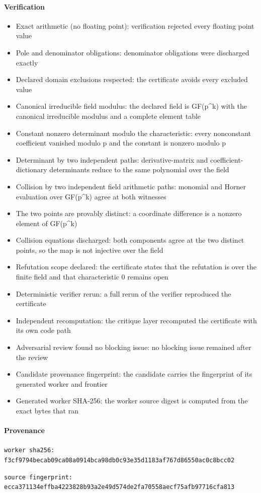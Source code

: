\documentclass{article}
\begin{document}
\paragraph{Verification}
\begin{itemize}
  \item \checkmark Exact arithmetic (no floating point): verification rejected every floating point value
  \item \checkmark Pole and denominator obligations: denominator obligations were discharged exactly
  \item \checkmark Declared domain exclusions respected: the certificate avoids every excluded value
  \item \checkmark Canonical irreducible field modulus: the declared field is GF(p\textasciicircum{}k) with the canonical irreducible modulus and a complete element table
  \item \checkmark Constant nonzero determinant modulo the characteristic: every nonconstant coefficient vanished modulo p and the constant is nonzero modulo p
  \item \checkmark Determinant by two independent paths: derivative-matrix and coefficient-dictionary determinants reduce to the same polynomial over the field
  \item \checkmark Collision by two independent field arithmetic paths: monomial and Horner evaluation over GF(p\textasciicircum{}k) agree at both witnesses
  \item \checkmark The two points are provably distinct: a coordinate difference is a nonzero element of GF(p\textasciicircum{}k)
  \item \checkmark Collision equations discharged: both components agree at the two distinct points, so the map is not injective over the field
  \item \checkmark Refutation scope declared: the certificate states that the refutation is over the finite field and that characteristic 0 remains open
  \item \checkmark Deterministic verifier rerun: a full rerun of the verifier reproduced the certificate
  \item \checkmark Independent recomputation: the critique layer recomputed the certificate with its own code path
  \item \checkmark Adversarial review found no blocking issue: no blocking issue remained after the review
  \item \checkmark Candidate provenance fingerprint: the candidate carries the fingerprint of its generated worker and frontier
  \item \checkmark Generated worker SHA-256: the worker source digest is computed from the exact bytes that ran
\end{itemize}

\paragraph{Provenance}
\texttt{worker sha256: f3cf9794becab09ca08a0914bca98db0c93e35d1183af767d86550ac0c8bcc02}

\texttt{source fingerprint: ecca371134effba4223828b93a2e49d574de2fa70558aecf75afb97716cfa813}
\end{document}
